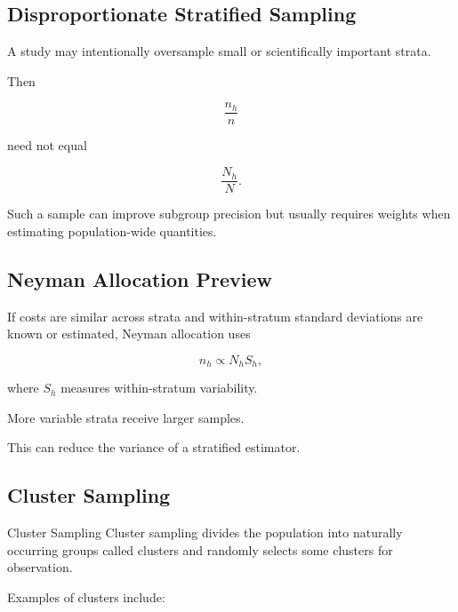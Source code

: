 \subsection{Disproportionate Stratified Sampling}
\label{subsec:disproportionate-stratified-sampling}

A study may intentionally oversample small or scientifically important
strata.

Then

\[
\frac{n_h}{n}
\]

need not equal

\[
\frac{N_h}{N}.
\]

Such a sample can improve subgroup precision but usually requires
weights when estimating population-wide quantities.

\subsection{Neyman Allocation Preview}
\label{subsec:neyman-allocation-preview}

If costs are similar across strata and within-stratum standard deviations
are known or estimated, Neyman allocation uses

\[
\boxed{
n_h
\propto
N_hS_h,
}
\]

where \(S_h\) measures within-stratum variability.

More variable strata receive larger samples.

This can reduce the variance of a stratified estimator.

\subsection{Cluster Sampling}
\label{subsec:cluster-sampling}

\begin{definitionbox}{Cluster Sampling}
Cluster sampling divides the population into naturally occurring groups
called clusters and randomly selects some clusters for observation.
\end{definitionbox}

Examples of clusters include:

